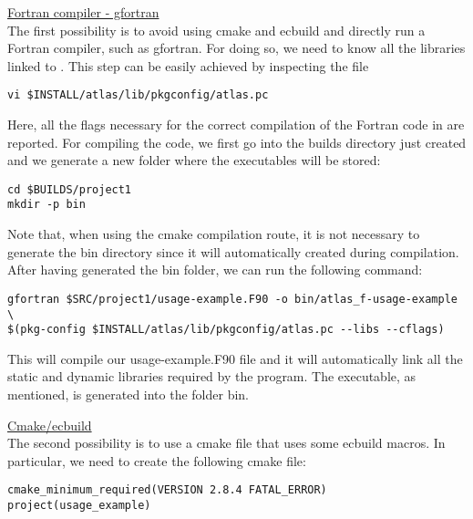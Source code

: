 \begin{description}
%
\item \underline{Fortran compiler - gfortran}\\[0.5em]
%
The first possibility is to 
avoid using cmake and ecbuild and directly run a Fortran compiler, 
such as gfortran. For doing so, we need to know all the libraries 
linked to \Atlas. This step can be easily achieved by inspecting 
the file 
%
\begin{lstlisting}[style=BashStyle]
vi $INSTALL/atlas/lib/pkgconfig/atlas.pc
\end{lstlisting}
%
Here, all the flags necessary for the correct compilation 
of the Fortran code in  are reported. For 
compiling the code, we first go into the builds directory 
just created and we generate a new folder where the executables 
will be stored: 
%
\begin{lstlisting}[style=BashStyle]
cd $BUILDS/project1
mkdir -p bin
\end{lstlisting}
%
Note that, when using the cmake compilation route, it is not 
necessary to generate the bin directory since it will automatically 
created during compilation.
After having generated the bin folder, we can run the following 
command:
%
\begin{lstlisting}[style=BashStyle]
gfortran $SRC/project1/usage-example.F90 -o bin/atlas_f-usage-example \ 
$(pkg-config $INSTALL/atlas/lib/pkgconfig/atlas.pc --libs --cflags)
\end{lstlisting}
%
This will compile our usage-example.F90 file and it will automatically 
link all the static and dynamic libraries required by the program. 
The executable, as mentioned, is generated into the folder bin.
%
\item \underline{Cmake/ecbuild}\\[0.5em]
%
The second possibility is to use a cmake file that uses some 
ecbuild macros. In particular, we need to create the following 
cmake file:
%
\begin{lstlisting}[style=XMLStyle]
cmake_minimum_required(VERSION 2.8.4 FATAL_ERROR)
project(usage_example)


\end{lstlisting}
\end{description}
